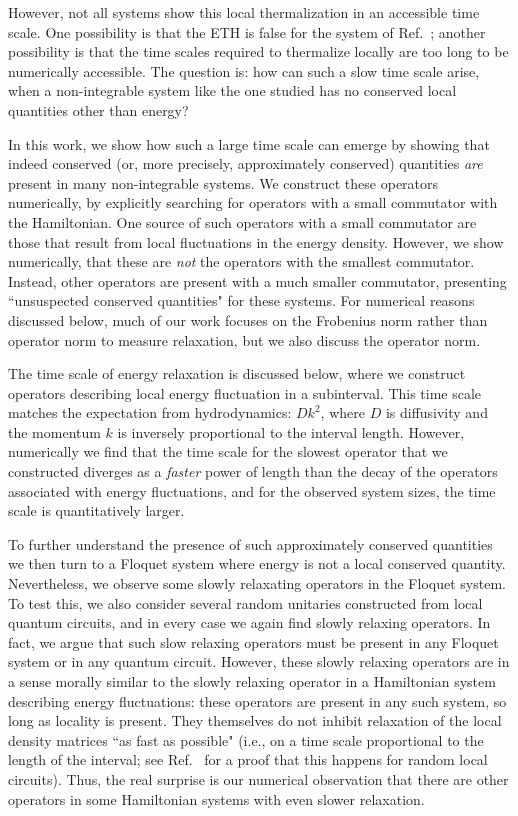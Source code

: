 \documentclass[twocolumn,superscriptaddress, prb]{revtex4-1}
\begin{document}
However, not all systems show this local thermalization in an accessible time scale\cite{Banuls:2011}.
One possibility is that the ETH is false for the system of Ref.~; another possibility is that the time scales required to thermalize locally are too long to be numerically accessible.  The question is: how can such a slow time scale arise, when a non-integrable system like the one studied has no conserved local quantities other than energy?

In this work, we show how such a large time scale can emerge by showing that indeed conserved (or, more precisely, approximately conserved) quantities {\it are} present in many non-integrable systems.  We construct these operators numerically, by explicitly searching for operators with a small commutator with the Hamiltonian.  One source of such operators with a small commutator are those that result from local fluctuations in the energy density.  However, we show numerically, that these are {\it not} the operators with the smallest commutator.  Instead, other operators are present with a much smaller commutator, presenting ``unsuspected conserved quantities" for these systems.  For numerical reasons discussed below, much of our work focuses on the Frobenius norm rather than operator norm to measure relaxation, but we also discuss the operator norm.


The time scale of energy relaxation is discussed below, where we construct operators describing local energy fluctuation in a subinterval.  This time scale matches the expectation
 from hydrodynamics:
$D k^2$, where $D$ is diffusivity and the momentum $k$ is inversely proportional to the interval length.
However, numerically we find that the time scale for the slowest operator that we constructed diverges as a {\it faster} power of length than the decay of the operators associated with energy fluctuations, and for the observed system sizes, the time scale is quantitatively larger.

To further understand the presence of such approximately conserved quantities we then turn to a Floquet system where energy is not a local conserved quantity.
Nevertheless, we observe some slowly relaxating operators in the Floquet system.
To test this, we also consider several random unitaries constructed from local quantum circuits, and in every case we again find slowly relaxing operators.
In fact, we argue that such slow relaxing operators must be present in any Floquet system or in any quantum circuit.  However, these slowly relaxing operators are in a sense morally similar to the slowly relaxing operator in a Hamiltonian system describing energy fluctuations: these operators are present in any such system, so long as locality is present.  They themselves do not inhibit relaxation of the local density matrices ``as fast as possible" (i.e., on a time scale proportional to the length of the interval; see Ref.~ for a proof that this happens for random local circuits).  Thus, the real surprise is our numerical observation that there are other operators in some Hamiltonian systems with even slower relaxation.
\end{document}
